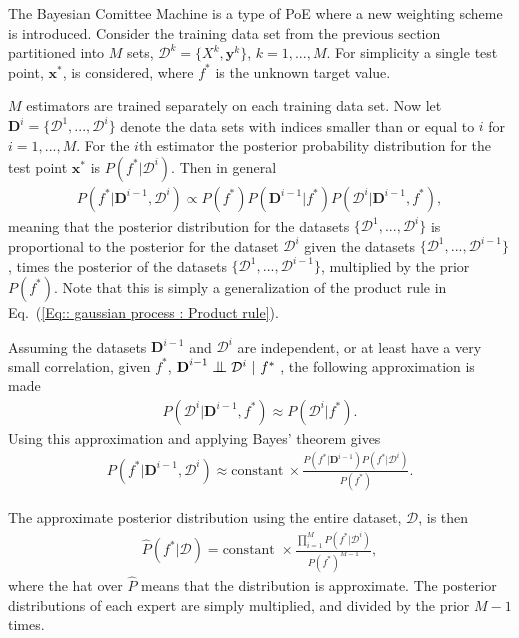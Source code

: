 \documentclass[twoside,english]{uiofysmaster}
\newcommand{\bigCI}{\mathrel{\text{\scalebox{1.07}{$\perp\mkern-10mu\perp$}}}}
\begin{document}
{The Bayesian Comittee Machine \cite{tresp2000bayesian} is a type of PoE where a new weighting scheme is introduced. Consider the training data set from the previous section partitioned into $M$ sets, $\mathcal{D}^k = \{X^k, \textbf{y}^k \}$, $k = 1,...,M$. For simplicity a single test point, $\textbf{x}^*$, is considered, where $f^*$ is the unknown target value.

$M$ estimators are trained separately on each training data set. Now let $\textbf{D}^{i} = \{ \mathcal{D}^1, ..., \mathcal{D}^i \}$ denote the data sets with indices smaller than or equal to $i$ for $i=1,...,M$. For the $i$th estimator the posterior probability distribution for the test point $\textbf{x}^*$ is $P(f^* | \mathcal{D}^{i})$. Then in general
\begin{align}
P(f^* |  \textbf{D}^{i-1}, \mathcal{D}^i) \propto P(f^*) P(\textbf{D}^{i-1} | f^*) P (\mathcal{D}^i | \textbf{D}^{i-1}, f^*),
\end{align}
meaning that the posterior distribution for the datasets $\{ \mathcal{D}^1,..., \mathcal{D}^i \}$ is proportional to the posterior for the dataset $\mathcal{D}^i$ given the datasets $\{\mathcal{D}^1,..., \mathcal{D}^{i-1} \}$, times the posterior of the datasets $\{ \mathcal{D}^1,..., \mathcal{D}^{i-1}\}$, multiplied by the prior $P(f^*)$. Note that this is simply a generalization of the product rule in Eq.~(\ref{Eq:: gaussian process : Product rule}).

Assuming the datasets $\textbf{D}^{i-1}$ and $\mathcal{D}^i$ are independent, or at least have a very small correlation, given $f^*$, $\textbf{D}^{i-1} \bigCI \mathcal{D}^i ~|~ f^*$ , the following approximation is made
\begin{align}\label{Eq:: evaluating cross : BCM assumption}
P(\mathcal{D}^i | \textbf{D}^{i-1},f^*) \approx P(\mathcal{D}^i | f^*).
\end{align}
Using this approximation and applying Bayes' theorem gives
\begin{align}
P(f^* | \textbf{D}^{i-1}, \mathcal{D}^i) \approx \text{constant}~ \times \frac{P(f^*|\textbf{D}^{i-1}) P(f^* | \mathcal{D}^i)}{P(f^*)}. 
\end{align}

The approximate posterior distribution using the entire dataset, $\mathcal{D}$, is then 
\begin{align}
\hat{P}(f^* | \mathcal{D}) = \text{constant } \times \frac{\prod_{i=1}^M P(f^*| \mathcal{D}^i)}{P(f^*)^{M-1}} ,
\end{align}
where the hat over $\hat{P}$ means that the distribution is approximate. The posterior distributions of each expert are simply multiplied, and divided by the prior $M-1$ times.

}
\end{document}
